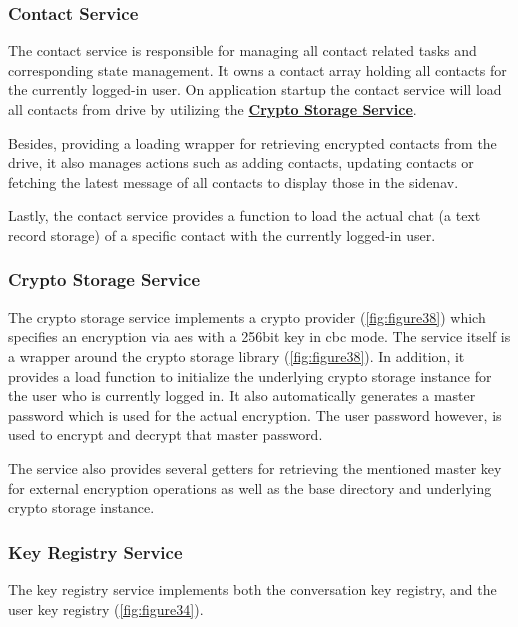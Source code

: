 \subsubsection{Contact Service}\label{subsubsec:contact-service}

The contact service is responsible for managing all contact related tasks and corresponding state management.
It owns a contact array holding all contacts for the currently logged-in user.
On application startup the contact service will load all contacts from drive by utilizing the
\textbf{\hyperref[subsubsec:crypto-storage-service]{Crypto Storage Service}}.

Besides, providing a loading wrapper for retrieving encrypted contacts from the drive, it also manages actions such as
adding contacts, updating contacts or fetching the latest message of all contacts to display those in the sidenav.

Lastly, the contact service provides a function to load the actual chat (a text record storage) of a specific contact
with the currently logged-in user.

\subsubsection{Crypto Storage Service}

The crypto storage service implements a crypto provider (\ref{fig:figure38}) which specifies an encryption via \ac{aes}
with a 256bit key in cbc mode.
The service itself is a wrapper around the crypto storage library (\ref{fig:figure38}).
In addition, it provides a load function to initialize the underlying crypto storage instance for the user who is
currently logged in.
It also automatically generates a master password which is used for the actual encryption.
The user password however, is used to encrypt and decrypt that master password.

The service also provides several getters for retrieving the mentioned master key for external encryption operations as
well as the base directory and underlying crypto storage instance.

\subsubsection{Key Registry Service}

The key registry service implements both the conversation key registry, and the user key registry (\ref{fig:figure34}).



